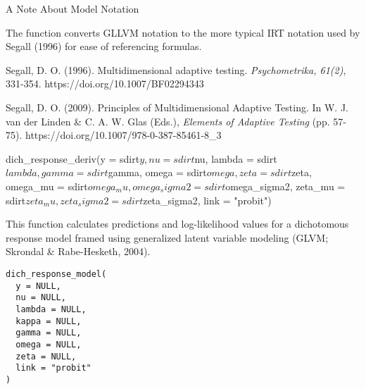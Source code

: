 \documentclass[a4paper]{book}
\begin{document}
%
\begin{Section}{A Note About Model Notation}

The function converts GLLVM notation to the more typical IRT notation used by
Segall (1996) for ease of referencing formulas.
\end{Section}
%
\begin{References}\relax
Segall, D. O. (1996). Multidimensional adaptive testing.
\emph{Psychometrika, 61(2)}, 331-354. https://doi.org/10.1007/BF02294343

Segall, D. O. (2009). Principles of Multidimensional Adaptive Testing. In W.
J. van der Linden \& C. A. W. Glas (Eds.), \emph{Elements of Adaptive Testing}
(pp. 57-75). https://doi.org/10.1007/978-0-387-85461-8\_3
\end{References}
%
\begin{Examples}
\begin{ExampleCode}
dich_response_deriv(y = sdirt$y, nu = sdirt$nu, lambda = sdirt$lambda,
                gamma = sdirt$gamma, omega = sdirt$omega, zeta = sdirt$zeta,
                omega_mu = sdirt$omega_mu, omega_sigma2 = sdirt$omega_sigma2,
                zeta_mu = sdirt$zeta_mu, zeta_sigma2 = sdirt$zeta_sigma2,
                link  = "probit")

\end{ExampleCode}
\end{Examples}
%
\begin{Description}\relax
This function calculates predictions and log-likelihood values for a
dichotomous response model framed using generalized latent variable modeling
(GLVM; Skrondal \& Rabe-Hesketh, 2004).
\end{Description}
%
\begin{Usage}
\begin{verbatim}
dich_response_model(
  y = NULL,
  nu = NULL,
  lambda = NULL,
  kappa = NULL,
  gamma = NULL,
  omega = NULL,
  zeta = NULL,
  link = "probit"
)
\end{verbatim}
\end{Usage}
%
\end{document}
